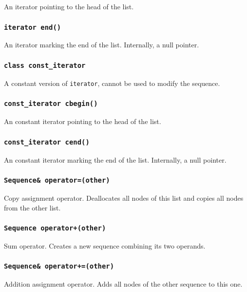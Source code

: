 ﻿\documentclass{article}
\begin{document}
An iterator pointing to the head of the list.

\subsubsection{{\tt iterator end()}}

An iterator marking the end of the list. Internally, a null pointer.

\subsubsection{{\tt class const\_iterator}}

A constant version of {\tt iterator}, cannot be used to modify the sequence.

\subsubsection{{\tt const\_iterator cbegin()}}

An constant iterator pointing to the head of the list.

\subsubsection{{\tt const\_iterator cend()}}

An constant iterator marking the end of the list. Internally, a null pointer.

\subsubsection{{\tt Sequence\& operator=(other)}}

Copy assignment operator. Deallocates all nodes of this list and copies all
nodes from the other list.

\subsubsection{{\tt Sequence operator+(other)}}

Sum operator. Creates a new sequence combining its two operands.

\subsubsection{{\tt Sequence\& operator+=(other)}}

Addition assignment operator. Adds all nodes of the other sequence to this one.
\end{document}
